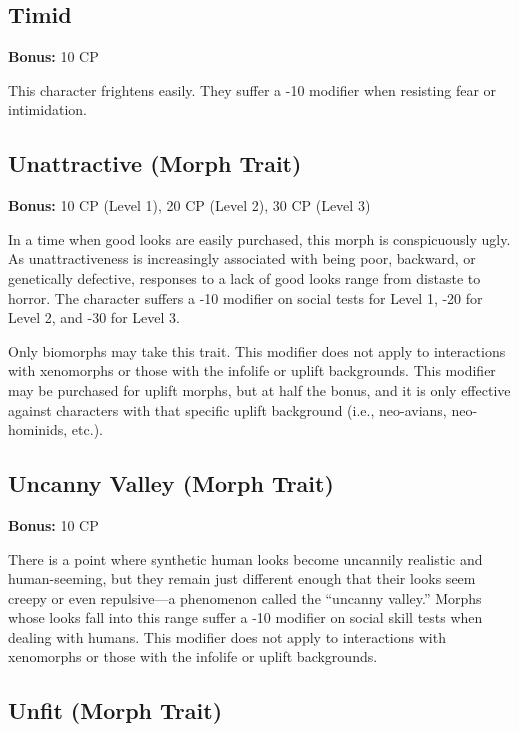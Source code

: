 \subsection{Timid} \label{sec:traits-timid} 

\textbf{Bonus:} 10 CP 

This character frightens easily. They suffer a -10 modifier when resisting fear or intimidation. 

\subsection{Unattractive (Morph Trait)} \label{sec:traits-unattractive} 

\textbf{Bonus:} 10 CP (Level 1), 20 CP (Level 2), 30 CP (Level 3) 

In a time when good looks are easily purchased, this morph is conspicuously ugly. As unattractiveness is increasingly associated with being poor, backward, or genetically defective, responses to a lack of good looks range from distaste to horror. The character suffers a -10 modifier on social tests for Level 1, -20 for Level 2, and -30 for Level 3. 

Only biomorphs may take this trait. This modifier does not apply to interactions with xenomorphs or those with the infolife or uplift backgrounds. This modifier may be purchased for uplift morphs, but at half the bonus, and it is only effective against characters with that specific uplift background (i.e., neo-avians, neo-hominids, etc.). 

\subsection{Uncanny Valley (Morph Trait)} \label{sec:traits-uncanny-valley} 

\textbf{Bonus:} 10 CP 

There is a point where synthetic human looks become uncannily realistic and human-seeming, but they remain just different enough that their looks seem creepy or even repulsive—a phenomenon called the “uncanny valley.” Morphs whose looks fall into this range suffer a -10 modifier on social skill tests when dealing with humans. This modifier does not apply to interactions with xenomorphs or those with the infolife or uplift backgrounds. 

\subsection{Unfit (Morph Trait)} \label{sec:traits-unfit} 


